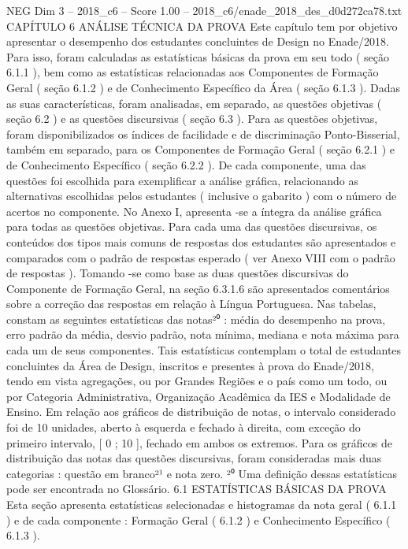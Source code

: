 \begin{textsample}{NEG Dim 3 – 2018\_c6 – Score 1.00 – 2018\_c6/enade\_2018\_des\_d0d272ca78.txt}  \label{ex:f3_neg_171}
CAPÍTULO 6 ANÁLISE TÉCNICA DA PROVA Este capítulo tem por objetivo apresentar o desempenho dos estudantes concluintes de Design no Enade/2018.
Para isso, foram calculadas as estatísticas básicas da prova em seu todo ( seção 6.1.1 ), bem como as estatísticas relacionadas aos Componentes de Formação Geral ( seção 6.1.2 ) e de Conhecimento Específico da Área ( seção 6.1.3 ).
Dadas as suas características, foram analisadas, em separado, as questões objetivas ( seção 6.2 ) e as questões discursivas ( seção 6.3 ).
Para as questões objetivas, foram disponibilizados os índices de facilidade e de discriminação Ponto-Bisserial, também em separado, para os Componentes de Formação Geral ( seção 6.2.1 ) e de Conhecimento Específico ( seção 6.2.2 ).
De cada componente, uma das questões foi escolhida para exemplificar a análise gráfica, relacionando as alternativas escolhidas pelos estudantes ( inclusive o gabarito ) com o número de acertos no componente.
No Anexo I, apresenta -se a íntegra da análise gráfica para todas as questões objetivas.
Para cada uma das questões discursivas, os conteúdos dos tipos mais comuns de respostas dos estudantes são apresentados e comparados com o padrão de respostas esperado ( ver Anexo VIII com o padrão de respostas ).
Tomando -se como base as duas questões discursivas do Componente de Formação Geral, na seção 6.3.1.6 são apresentados comentários sobre a correção das respostas em relação à Língua Portuguesa.
Nas tabelas, constam as seguintes estatísticas das notas²⁰ : média do desempenho na prova, erro padrão da média, desvio padrão, nota mínima, mediana e nota máxima para cada um de seus componentes.
Tais estatísticas contemplam o total de estudantes concluintes da Área de Design, inscritos e presentes à prova do Enade/2018, tendo em vista agregações, ou por Grandes Regiões e o país como um todo, ou por Categoria Administrativa, Organização Acadêmica da IES e Modalidade de Ensino.
Em relação aos gráficos de distribuição de notas, o intervalo considerado foi de 10 unidades, aberto à esquerda e fechado à direita, com exceção do primeiro intervalo, [ 0 ; 10 ], fechado em ambos os extremos.
Para os gráficos de distribuição das notas das questões discursivas, foram consideradas mais duas categorias : questão em branco²¹ e nota zero. ²⁰ Uma definição dessas estatísticas pode ser encontrada no Glossário. 6.1 ESTATÍSTICAS BÁSICAS DA PROVA Esta seção apresenta estatísticas selecionadas e histogramas da nota geral ( 6.1.1 ) e de cada componente : Formação Geral ( 6.1.2 ) e Conhecimento Específico ( 6.1.3 ).

\end{textsample}
